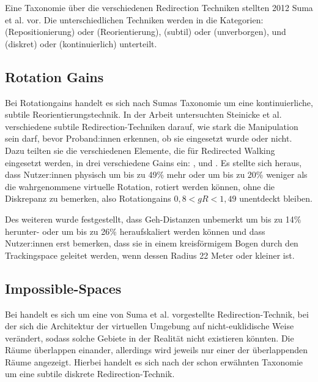 Eine Taxonomie über die verschiedenen Redirection Techniken stellten 2012 Suma et al. \cite{taxonomy} vor. Die unterschiedlichen Techniken werden in die Kategorien:  (Repositionierung) oder  (Reorientierung),  (subtil) oder  (unverborgen), und  (diskret) oder  (kontinuierlich) unterteilt.


\subsection{Rotation Gains}

Bei Rotationgains handelt es sich nach Sumas Taxonomie \cite{taxonomy} um eine kontinuierliche, subtile Reorientierungstechnik. In der Arbeit \cite{detection-thresholds} untersuchten Steinicke et al. verschiedene subtile Redirection-Techniken darauf, wie stark die Manipulation sein darf, bevor Proband:innen erkennen, ob sie eingesetzt wurde oder nicht. Dazu teilten sie die verschiedenen Elemente, die für Redirected Walking eingesetzt werden, in drei verschiedene Gains ein: ,  und . Es stellte sich heraus, dass Nutzer:innen physisch um bis zu 49\% mehr oder um bis zu 20\% weniger als die wahrgenommene virtuelle Rotation, rotiert werden können, ohne die Diskrepanz zu bemerken, also Rotationgains $0,8 < gR < 1,49$ unentdeckt bleiben.

Des weiteren wurde festgestellt, dass Geh-Distanzen unbemerkt um bis zu 14\% herunter- oder um bis zu 26\% heraufskaliert werden können und dass Nutzer:innen erst bemerken, dass sie in einem kreisförmigem Bogen durch den Trackingspace geleitet werden, wenn dessen Radius 22 Meter oder kleiner ist.

\subsection{Impossible-Spaces}

Bei  handelt es sich um eine von
Suma et al. \cite{impossible-spaces-suma} vorgestellte Redirection-Technik, bei der sich die Architektur der virtuellen Umgebung auf nicht-euklidische Weise verändert, sodass solche Gebiete in der Realität nicht existieren könnten.
Die Räume überlappen einander, allerdings wird jeweils nur einer der überlappenden Räume angezeigt. Hierbei handelt es sich nach der schon erwähnten Taxonomie um eine subtile diskrete Redirection-Technik.

